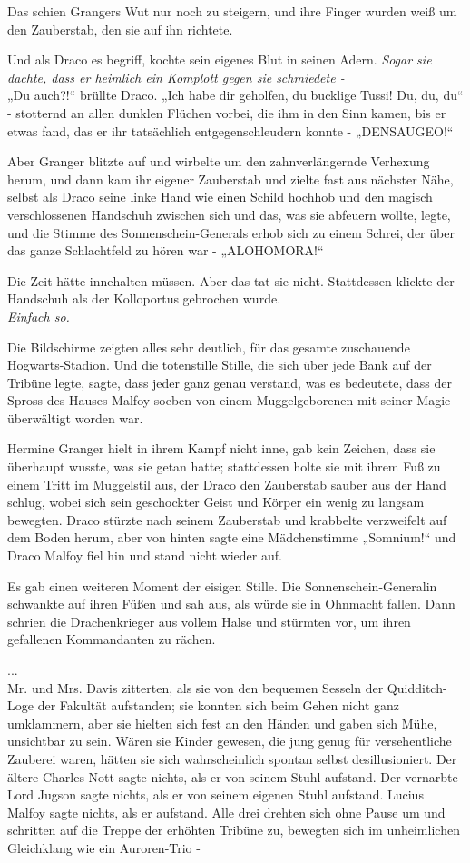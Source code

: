 {Das schien Grangers Wut nur noch zu steigern, und ihre Finger wurden weiß um den Zauberstab, den sie auf ihn richtete.

Und als Draco es begriff, kochte sein eigenes Blut in seinen Adern. \emph{Sogar sie dachte, dass er heimlich ein Komplott gegen sie schmiedete -}\\ „Du auch?!“ brüllte Draco. „Ich habe dir geholfen, du bucklige Tussi! Du, du, du“ - stotternd an allen dunklen Flüchen vorbei, die ihm in den Sinn kamen, bis er etwas fand, das er ihr tatsächlich entgegenschleudern konnte - „DENSAUGEO!“

Aber Granger blitzte auf und wirbelte um den zahnverlängernde Verhexung herum, und dann kam ihr eigener Zauberstab und zielte fast aus nächster Nähe, selbst als Draco seine linke Hand wie einen Schild hochhob und den magisch verschlossenen Handschuh zwischen sich und das, was sie abfeuern wollte, legte, und die Stimme des Sonnenschein-Generals erhob sich zu einem Schrei, der über das ganze Schlachtfeld zu hören war - „ALOHOMORA!“

Die Zeit hätte innehalten müssen. Aber das tat sie nicht. Stattdessen klickte der Handschuh als der Kolloportus gebrochen wurde.\\ \emph{Einfach so.}

Die Bildschirme zeigten alles sehr deutlich, für das gesamte zuschauende Hogwarts-Stadion. Und die totenstille Stille, die sich über jede Bank auf der Tribüne legte, sagte, dass jeder ganz genau verstand, was es bedeutete, dass der Spross des Hauses Malfoy soeben von einem Muggelgeborenen mit seiner Magie überwältigt worden war.

Hermine Granger hielt in ihrem Kampf nicht inne, gab kein Zeichen, dass sie überhaupt wusste, was sie getan hatte; stattdessen holte sie mit ihrem Fuß zu einem Tritt im Muggelstil aus, der Draco den Zauberstab sauber aus der Hand schlug, wobei sich sein geschockter Geist und Körper ein wenig zu langsam bewegten. Draco stürzte nach seinem Zauberstab und krabbelte verzweifelt auf dem Boden herum, aber von hinten sagte eine Mädchenstimme „Somnium!“ und Draco Malfoy fiel hin und stand nicht wieder auf.

Es gab einen weiteren Moment der eisigen Stille. Die Sonnenschein-Generalin schwankte auf ihren Füßen und sah aus, als würde sie in Ohnmacht fallen. Dann schrien die Drachenkrieger aus vollem Halse und stürmten vor, um ihren gefallenen Kommandanten zu rächen.

...\\ Mr. und Mrs. Davis zitterten, als sie von den bequemen Sesseln der Quidditch-Loge der Fakultät aufstanden; sie konnten sich beim Gehen nicht ganz umklammern, aber sie hielten sich fest an den Händen und gaben sich Mühe, unsichtbar zu sein. Wären sie Kinder gewesen, die jung genug für versehentliche Zauberei waren, hätten sie sich wahrscheinlich spontan selbst desillusioniert. Der ältere Charles Nott sagte nichts, als er von seinem Stuhl aufstand. Der vernarbte Lord Jugson sagte nichts, als er von seinem eigenen Stuhl aufstand. Lucius Malfoy sagte nichts, als er aufstand. Alle drei drehten sich ohne Pause um und schritten auf die Treppe der erhöhten Tribüne zu, bewegten sich im unheimlichen Gleichklang wie ein Auroren-Trio -

}
